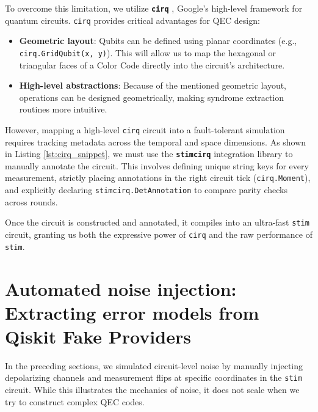 To overcome this limitation, we utilize \textbf{\texttt{cirq}} \cite{cirq_developers}, Google's high-level framework for quantum circuits. \texttt{cirq} provides critical advantages for QEC design:
\begin{itemize}
    \item \textbf{Geometric layout}: Qubits can be defined using planar coordinates (e.g., \texttt{cirq.GridQubit(x, y)}). This will allow us to map the hexagonal or triangular faces of a Color Code directly into the circuit's architecture.
    \item \textbf{High-level abstractions}: Because of the mentioned geometric layout, operations can be designed geometrically, making syndrome extraction routines more intuitive.
\end{itemize}

However, mapping a high-level \texttt{cirq} circuit into a fault-tolerant simulation requires tracking metadata across the temporal and space dimensions. As shown in Listing \ref{lst:cirq_snippet}, we must use the \textbf{\texttt{stimcirq}} integration library to manually annotate the circuit. This involves defining unique string keys for every measurement, strictly placing annotations in the right circuit tick (\texttt{cirq.Moment}), and explicitly declaring \texttt{stimcirq.DetAnnotation} to compare parity checks across rounds.

Once the circuit is constructed and annotated, it compiles into an ultra-fast \texttt{stim} circuit, granting us both the expressive power of \texttt{cirq} and the raw performance of \texttt{stim}.


\section{Automated noise injection: Extracting error models from Qiskit Fake Providers}
\label{sec:qiskit_noise_model}

In the preceding sections, we simulated circuit-level noise by manually injecting depolarizing channels and measurement flips at specific coordinates in the \texttt{stim} circuit. While this illustrates the mechanics of noise, it does not scale when we try to construct complex QEC codes.


